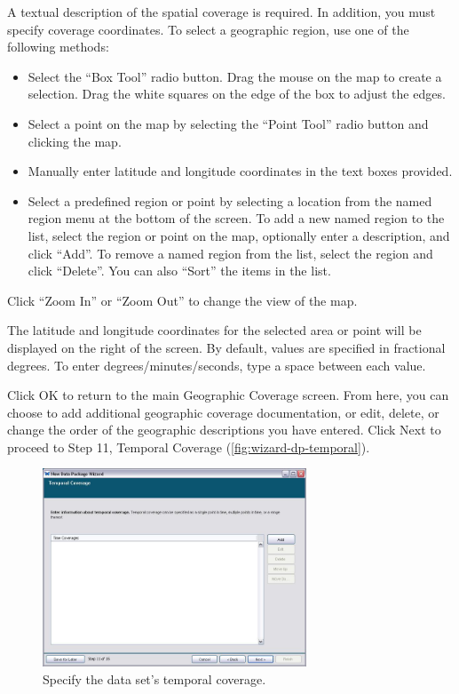 A textual description of the spatial coverage is required. In addition,
you must specify coverage coordinates. To select a geographic region,
use one of the following methods:
\begin{itemize}
  \setlength{\parskip}{1pt}
  \item Select the ``Box Tool'' radio button. Drag the mouse on the map
    to create a selection. Drag the white squares on the edge of the box
    to adjust the edges. 
  \item Select a point on the map by selecting the ``Point Tool'' radio
    button and clicking the map. 
  \item Manually enter latitude and longitude coordinates in the text
    boxes provided.
  \item Select a predefined region or point by selecting a location from
    the named region menu at the bottom of the screen. To add a new
    named region to the list, select the region or point on the map,
    optionally enter a description, and click ``Add''. To remove a named
    region from the list, select the region and click ``Delete''. You
    can also ``Sort'' the items in the list. 
\end{itemize}

Click ``Zoom In'' or ``Zoom Out'' to change the view of the map.

The latitude and longitude coordinates for the selected area or point
will be displayed on the right of the screen. By default, values are
specified in fractional degrees. To enter degrees/minutes/seconds, type
a space between each value.

Click OK to return to the main Geographic Coverage screen. From here,
you can choose to add additional geographic coverage documentation, or
edit, delete, or change the order of the geographic descriptions you
have entered. Click Next to proceed to Step 11, Temporal Coverage
(\autoref{fig:wizard-dp-temporal}).
 
\begin{figure}
  \centering
    \includegraphics[width=0.7\textwidth]{images/wizard-dp-temporal.jpg}
  \caption{Specify the data set's temporal coverage.}
  \label{fig:wizard-dp-temporal}
\end{figure}

